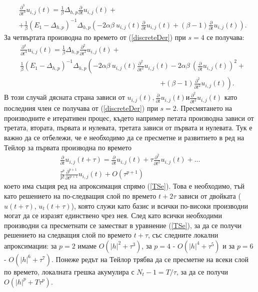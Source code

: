 \documentclass{article}
\newcommand{\rf}[1]{(\ref{#1})}
\begin{document}
\begin{align} \label{der3}
 &\frac{\partial^3}{\partial t^3}u_{i,j}(t) = \frac{1}{\beta}\Delta_{h,p} \frac{\partial}{\partial t}u_{i, j}(t) + \nonumber\\
&+ \frac{1}{\beta} (E_1-\Delta_{h,p})^{-1}\Delta_{h,p} \left( -2 \alpha \beta \: u_{i, j}(t) \frac{\partial}{\partial t}u_{i, j}(t) +  (\beta-1) \frac{\partial}{\partial t} u_{i, j}(t) \right).
\end{align}
За четвъртата производна по времето от \rf{discreteDer} при $s=4$ се получава:
\begin{align} \label{der4}
&\frac{\partial^4}{\partial t^4}u_{i,j}(t) = \frac{1}{\beta}\Delta_{h,p} \frac{\partial^2}{\partial t^2}u_{i, j}(t) +   \nonumber\\
& \frac{1}{\beta}(E_1-\Delta_{h,p})^{-1}\Delta_{h,p} \left( -2 \alpha \beta \:  u_{i, j}(t)\frac{\partial^2}{\partial t^2}u_{i, j}(t) -2 \alpha \beta \: \left( \frac{\partial}{\partial t}u_{i, j}(t) \right)^2 + \right. \nonumber\\
&\quad \quad \quad \quad \quad \quad \quad \quad \quad \quad \quad \quad \quad \quad \quad \quad \quad \quad \quad \quad \left. +  (\beta-1) \frac{\partial^2}{\partial t^2} u_{i, j}(t) \right) .
\end{align}
В този случай дясната страна зависи от $u_{i, j}(t), \frac{\partial}{\partial t}u_{i, j}(t) и \frac{\partial^2}{\partial t^2}u_{i, j}(t)$ като последния член се получава от \rf{discreteDer} при $s=2$. Пресмятането на производните е итеративен процес, където например петата производна зависи от третата, втората, първата и нулевата, третата зависи от първата и нулевата. Тук е важно да се отбележи, че е необходимо да се пресметне и развитието в ред на Тейлор за първата производна по времето
\begin{align} \label{TSeDer}
\frac{ \partial}{ \partial t }u_{i,j}(t+\tau) = \frac{ \partial }{ \partial t }u_{i,j}(t) + \tau \frac{ \partial^2 }{ \partial t^2 }u_{i,j}(t)  + ... 
\nonumber\\
\frac{ \tau^p }{ p! } \frac{ \partial^{p+1}}{ \partial t^{p+1} }u_{i,j}(t) + O(\tau^{p+1})
\end{align}
което има същия ред на апроксимация спрямо \rf{TSe}. Това е необходимо, тъй като решението на по-следващия слой по времето $t+2\tau$ зависи от двойката ($u(t+\tau)$, $u_t(t+\tau)$), която служи като базис и всички по-високи производни могат да се изразят единствено чрез нея. След като всички необходими производни са пресметнати се заместват в уравнение \rf{TSe}, за да се получи решението на следващия слой по времето $t+\tau$, със следните локални апроксимации: за $p=2$ имаме $O(|h|^2 + \tau^3)$, за $p=4$ - $O(|h|^4 + \tau^5)$ и за $p=6$ - $O(|h|^6 + \tau^7)$. Понеже редът на Тейлор трябва да се пресметне на всеки слой по времето, локалната грешка акумулира с $N_t - 1 = T/\tau$, за да се получи $O(|h|^p + T \tau^p)$.
\end{document}
